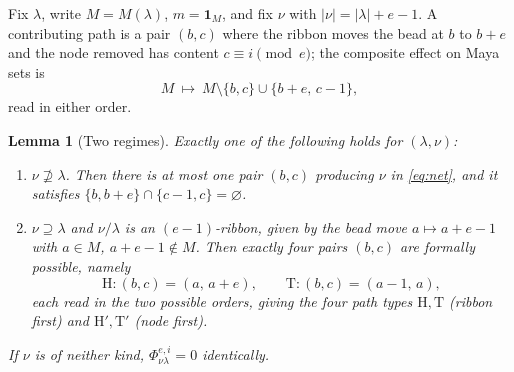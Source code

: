 \documentclass[11pt]{article}
\theoremstyle{plain}
\newtheorem{lemma}[theorem]{Lemma}
\theoremstyle{definition}
\begin{document}
Fix $\lambda$, write $M=M(\lambda)$, $m=\mathbf 1_M$, and fix $\nu$ with
$|\nu|=|\lambda|+e-1$. A contributing path is a pair $(b,c)$ where the ribbon moves
the bead at $b$ to $b+e$ and the node removed has content $c\equiv i\pmod e$; the
composite effect on Maya sets is
\begin{equation}\label{eq:net}
M\ \longmapsto\ M\setminus\{b,c\}\cup\{b+e,\,c-1\},
\end{equation}
read in either order.

\begin{lemma}[Two regimes]\label{lem:regimes}
Exactly one of the following holds for $(\lambda,\nu)$:
\begin{enumerate}
\item[\rm(I)] $\nu\not\supseteq\lambda$. Then there is at most one pair $(b,c)$
producing $\nu$ in \eqref{eq:net}, and it satisfies
$\{b,b+e\}\cap\{c-1,c\}=\varnothing$.
\item[\rm(II)] $\nu\supseteq\lambda$ and $\nu/\lambda$ is an $(e-1)$-ribbon, given
by the bead move $a\mapsto a+e-1$ with $a\in M$, $a+e-1\notin M$. Then exactly four
pairs $(b,c)$ are formally possible, namely
\[
\mathrm{H}:(b,c)=(a,\,a+e),\qquad
\mathrm{T}:(b,c)=(a-1,\,a),
\]
each read in the two possible orders, giving the four \emph{path types}
$\mathrm H,\mathrm T$ (ribbon first) and $\mathrm H',\mathrm T'$ (node first).
\end{enumerate}
If $\nu$ is of neither kind, $\Phi^{e,i}_{\nu\lambda}=0$ identically.
\end{lemma}
\end{document}
